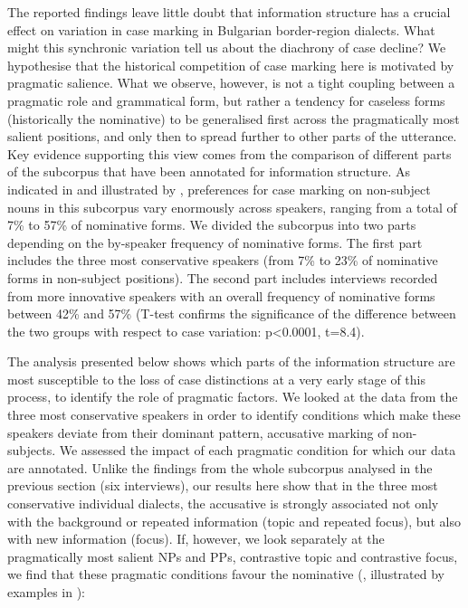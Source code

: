 \documentclass[output=paper]{langscibook}
\begin{document}
The reported findings leave little doubt that information structure has a crucial effect on variation in case marking in Bulgarian border-region dialects. What might this synchronic variation tell us about the diachrony of case decline? We hypothesise that the historical competition of case marking here is motivated by pragmatic salience. What we observe, however, is not a tight coupling between a pragmatic role and grammatical form, but rather a tendency for caseless forms (historically the nominative) to be generalised first across the pragmatically most salient positions, and only then to spread further to other parts of the utterance. Key evidence supporting this view comes from the comparison of different parts of the subcorpus that have been annotated for information structure. As indicated in  and illustrated by , preferences for case marking on non-subject nouns in this subcorpus vary enormously across speakers, ranging from a total of 7\% to 57\% of nominative forms. We divided the subcorpus into two parts depending on the by-speaker frequency of nominative forms. The first part includes the three most conservative speakers (from 7\% to 23\% of nominative forms in non-subject positions). The second part includes interviews recorded from more innovative speakers with an overall frequency of nominative forms between 42\% and 57\% (T-test confirms the significance of the difference between the two groups with respect to case variation: p<0.0001, t=8.4). 

The analysis presented below shows which parts of the information structure are most susceptible to the loss of case distinctions at a very early stage of this process, to identify the role of pragmatic factors. We looked at the data from the three most conservative speakers in order to identify conditions which make these speakers deviate from their dominant pattern, accusative marking of non-subjects. We assessed the impact of each pragmatic condition for which our data are annotated. Unlike the findings from the whole subcorpus analysed in the previous section (six interviews), our results here show that in the three most conservative individual dialects, the accusative is strongly associated not only with the background or repeated information (topic and repeated focus), but also with new information (focus). If, however, we look separately at the pragmatically most salient NPs and PPs, contrastive topic and contrastive focus, we find that these pragmatic conditions favour the nominative (, illustrated by examples in ):
\end{document}
